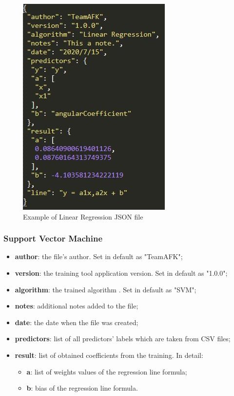 		\begin{figure}[H]
		\centering
		\includegraphics[scale=0.70]{../Developer_manual/img/linear_regression_json.JPG}
		\caption{Example of Linear Regression JSON file}
	\end{figure}	
	
		\subsubsection{Support Vector Machine}
		\begin{itemize}
			\item\textbf{author}: the file's author. Set in default as "TeamAFK";
			\item\textbf{version}: the training tool application version. Set in default as "1.0.0";
			\item\textbf{algorithm}: the trained algorithm . Set in default as "SVM"; 			\item\textbf{notes}: additional notes added to the file;
			\item\textbf{date}: the date when the file was created;
			\item\textbf{predictors}: list of all predictors' labels which are taken from CSV files;
			\item\textbf{result}: list of obtained coefficients from the training. In detail:
				\begin{itemize}
					\item\textbf{a}: list of weights values of the regression line formula;
					\item\textbf{b}: bias of the regression line formula.
				\end{itemize}
					
		\end{itemize}
		
